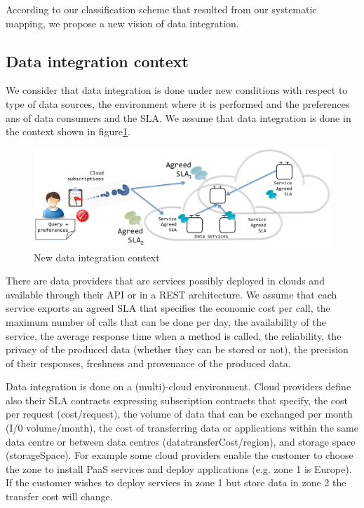 
According to our classification scheme that resulted from our systematic mapping, we propose a new vision of data integration. 

\subsection{Data integration context}
We consider that data integration is done under new conditions with respect to type of data sources, the environment where it is performed and the preferences ans of data consumers and the SLA. We assume that data integration is done in the  context shown in figure\ref{fig:vision}. 
\begin{figure}[h!]
\centering
\includegraphics[scale=0.50]{figs/DataIntegrationContext.pdf} 
\caption{New data integration context}\label{fig:vision}
\end{figure}

There are data providers that are services possibly deployed in clouds and available  through their API or in a REST architecture. We assume that  each service exports an agreed SLA that specifies the economic cost per call, the maximum number of calls that can be done per day, the availability of the service, the average response time when a method is called, the reliability, the privacy of the produced data (whether they can be stored or not), the precision of their responses, freshness and provenance of the produced data.  


Data integration is done on a (multi)-cloud environment. Cloud providers define also their SLA contracts expressing  subscription contracts that specify, the cost per request ({\sf cost/request}), the volume of data that can be exchanged per month ({\sf I/0 volume/month}), the cost of transferring data or applications within the same data centre or between data centres ({\sf datatransferCost/region}), and storage space ({\sf storageSpace}). For example some cloud providers enable the customer to choose the zone to install PaaS services and deploy applications (e.g. zone 1 is Europe). If the customer wishes to deploy services in zone 1 but store data in zone 2 the transfer cost will change.

